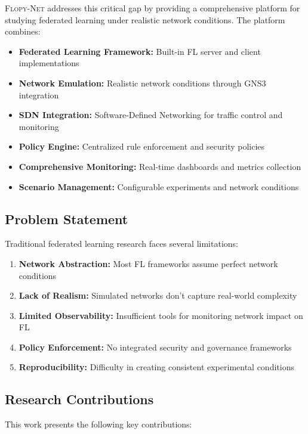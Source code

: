 \documentclass[12pt,a4paper,twoside]{article}
\newcommand{\flopynet}{\textsc{Flopy-Net}}
\begin{document}
\flopynet{} addresses this critical gap by providing a comprehensive platform for studying federated learning under realistic network conditions. The platform combines:

\begin{itemize}
    \item \textbf{Federated Learning Framework:} Built-in FL server and client implementations
    \item \textbf{Network Emulation:} Realistic network conditions through GNS3 integration
    \item \textbf{SDN Integration:} Software-Defined Networking for traffic control and monitoring
    \item \textbf{Policy Engine:} Centralized rule enforcement and security policies
    \item \textbf{Comprehensive Monitoring:} Real-time dashboards and metrics collection
    \item \textbf{Scenario Management:} Configurable experiments and network conditions
\end{itemize}

\subsection{Problem Statement}

Traditional federated learning research faces several limitations:

\begin{enumerate}
    \item \textbf{Network Abstraction:} Most FL frameworks assume perfect network conditions
    \item \textbf{Lack of Realism:} Simulated networks don't capture real-world complexity
    \item \textbf{Limited Observability:} Insufficient tools for monitoring network impact on FL
    \item \textbf{Policy Enforcement:} No integrated security and governance frameworks
    \item \textbf{Reproducibility:} Difficulty in creating consistent experimental conditions
\end{enumerate}

\subsection{Research Contributions}

This work presents the following key contributions:
\end{document}
